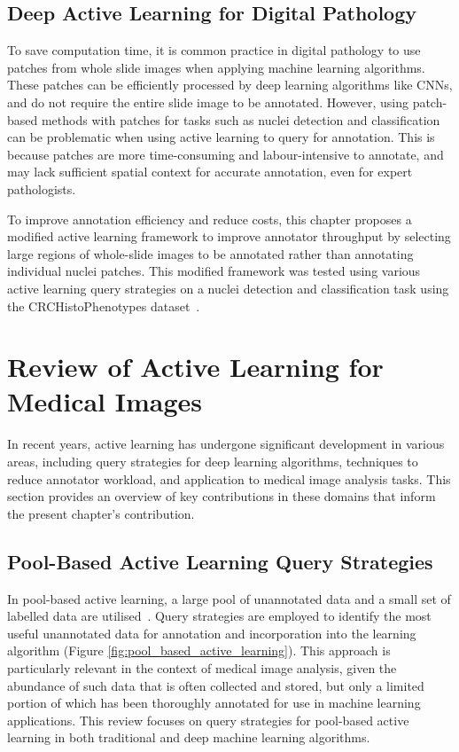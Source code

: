 \subsection{Deep Active Learning for Digital Pathology}
\label{subsec:active_deep_learning}
To save computation time, it is common practice in digital pathology to use patches from whole slide images when applying machine learning algorithms. These patches can be efficiently processed by deep learning algorithms like CNNs, and do not require the entire slide image to be annotated. However, using patch-based methods with patches for tasks such as nuclei detection and classification can be problematic when using active learning to query for annotation. This is because patches are more time-consuming and labour-intensive to annotate, and may lack sufficient spatial context for accurate annotation, even for expert pathologists.

To improve annotation efficiency and reduce costs, this chapter proposes a modified active learning framework to improve annotator throughput by selecting large regions of whole-slide images to be annotated rather than annotating individual nuclei patches. This modified framework was tested using various active learning query strategies on a nuclei detection and classification task using the CRCHistoPhenotypes dataset~\citep{sirinukunwattana2016locality}.



\section{Review of Active Learning for Medical Images}
\label{sec:active_review}
In recent years, active learning has undergone significant development in various areas, including query strategies for deep learning algorithms, techniques to reduce annotator workload, and application to medical image analysis tasks. This section provides an overview of key contributions in these domains that inform the present chapter's contribution.

\subsection{Pool-Based Active Learning Query Strategies}
\label{subsec:active_pool_based}
In pool-based active learning, a large pool of unannotated data and a small set of labelled data are utilised~\citep{settles2009active}. Query strategies are employed to identify the most useful unannotated data for annotation and incorporation into the learning algorithm (Figure \ref{fig:pool_based_active_learning}). This approach is particularly relevant in the context of medical image analysis, given the abundance of such data that is often collected and stored, but only a limited portion of which has been thoroughly annotated for use in machine learning applications. This review focuses on query strategies for pool-based active learning in both traditional and deep machine learning algorithms.

